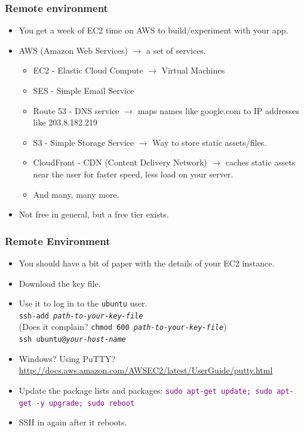 \documentclass{beamer}
\newcommand\aws[1]{\textcolor{purple}{\texttt{#1}}}
\begin{document}
\begin{frame}
  \frametitle{Remote environment}
  
  \begin{itemize}
  \item You get a week of EC2 time on AWS to build/experiment with your app.
  \item AWS (Amazon Web Services) $\to$ a set of services.
    \begin{itemize}
    \item EC2 - Elastic Cloud Compute $\to$ Virtual Machines
    \item SES - Simple Email Service
    \item Route 53 - DNS service $\to$ maps names like google.com to
      IP addresses like 203.8.182.219
    \item S3 - Simple Storage Service $\to$ Way to store static assets/files.
    \item CloudFront - CDN (Content Delivery Network) $\to$ caches
      static assets near the user for faster speed, less load on your
      server.
    \item And many, many more.
    \end{itemize}
  \item Not free in general, but a free tier exists.
  \end{itemize}
\end{frame}

\begin{frame}
  \frametitle{Remote Environment}
  \begin{itemize}
  \item You should have a bit of paper with the details of your EC2
    instance.
  \item Download the key file.
  \item Use it to log in to the \texttt{ubuntu} user. \\
    \texttt{ssh-add \textit{path-to-your-key-file}} \\
    (Does it complain? \texttt{chmod 600 \textit{path-to-your-key-file}})\\
    \texttt{ssh ubuntu@\textit{your-host-name}}
  \item Windows? Using PuTTY? \url{http://docs.aws.amazon.com/AWSEC2/latest/UserGuide/putty.html}
  \item Update the package lists and packages: \aws{sudo apt-get
      update; sudo apt-get -y upgrade; sudo reboot}
  \item SSH in again after it reboots.
  \end{itemize}
\end{frame}
\end{document}
